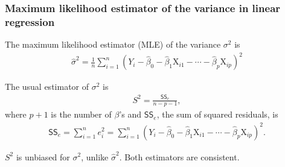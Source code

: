 \documentclass{beamer}
\begin{document}
\begin{frame}
\frametitle{Maximum likelihood estimator of the variance in linear regression}
\bi
\item The maximum likelihood estimator (MLE) of the variance $\sigma^2$ is
\begin{align*}
\hat{\sigma}^2=\frac{1}{n} \sum_{i=1}^n \left(Y_i-\hat{\beta}_0-\hat{\beta}_1\mathrm{X}_{i1}-\cdots-\hat{\beta}_p\mathrm{X}_{ip}\right)^2
\end{align*}
\item The usual estimator of  $\sigma^2$ is
\begin{align*}
S^2=\frac{\mathsf{SS}_e}{n -p-1},
\end{align*}
where $p+1$ is the number of $\beta$'s and $\mathsf{SS}_e $, the sum of squared residuals, is
\begin{align*}
\mathsf{SS}_e = \sum_{i=1}^n e_i^2= \sum_{i=1}^n \left(Y_i-\hat{\beta}_0-\hat{\beta}_1\mathrm{X}_{i1}-\cdots-\hat{\beta}_p\mathrm{X}_{ip}\right)^2.
\end{align*} 
\item $S^2$ is unbiased for $\sigma^2$, unlike $\hat{\sigma}^2$. Both estimators are consistent.
\ei
\end{frame}
% 
\end{document}
